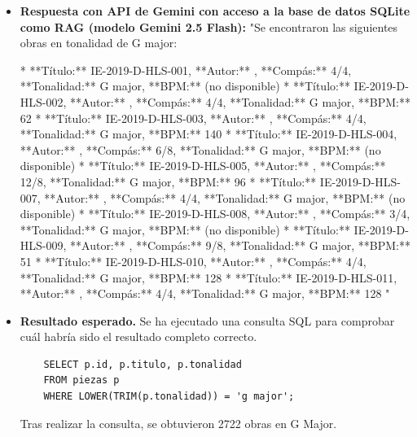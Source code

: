 \begin{itemize}
**Nota:** Esta respuesta asume que la pregunta está buscando identificar tonalidades en general. Si necesitas ayuda con algo específico, como una canción o pieza de música en particular, por favor proporciona más contexto y información."
    \item \textbf{Respuesta con API de Gemini con acceso a la base de datos SQLite como RAG (modelo Gemini 2.5 Flash):} "Se encontraron las siguientes obras en tonalidad de G major:

*   **Título:** IE-2019-D-HLS-001, **Autor:** , **Compás:** 4/4, **Tonalidad:** G major, **BPM:** (no disponible)
*   **Título:** IE-2019-D-HLS-002, **Autor:** , **Compás:** 4/4, **Tonalidad:** G major, **BPM:** 62
*   **Título:** IE-2019-D-HLS-003, **Autor:** , **Compás:** 4/4, **Tonalidad:** G major, **BPM:** 140
*   **Título:** IE-2019-D-HLS-004, **Autor:** , **Compás:** 6/8, **Tonalidad:** G major, **BPM:** (no disponible)
*   **Título:** IE-2019-D-HLS-005, **Autor:** , **Compás:** 12/8, **Tonalidad:** G major, **BPM:** 96
*   **Título:** IE-2019-D-HLS-007, **Autor:** , **Compás:** 4/4, **Tonalidad:** G major, **BPM:** (no disponible)
*   **Título:** IE-2019-D-HLS-008, **Autor:** , **Compás:** 3/4, **Tonalidad:** G major, **BPM:** (no disponible)
*   **Título:** IE-2019-D-HLS-009, **Autor:** , **Compás:** 9/8, **Tonalidad:** G major, **BPM:** 51
*   **Título:** IE-2019-D-HLS-010, **Autor:** , **Compás:** 4/4, **Tonalidad:** G major, **BPM:** 128
*   **Título:** IE-2019-D-HLS-011, **Autor:** , **Compás:** 4/4, **Tonalidad:** G major, **BPM:** 128
"
    \item \textbf{Resultado esperado.} Se ha ejecutado una consulta SQL para comprobar cuál habría sido el resultado completo correcto.
    \begin{verbatim}
    SELECT p.id, p.titulo, p.tonalidad
    FROM piezas p
    WHERE LOWER(TRIM(p.tonalidad)) = 'g major';
    \end{verbatim}    
    Tras realizar la consulta, se obtuvieron 2722 obras en G Major.


\end{itemize}


